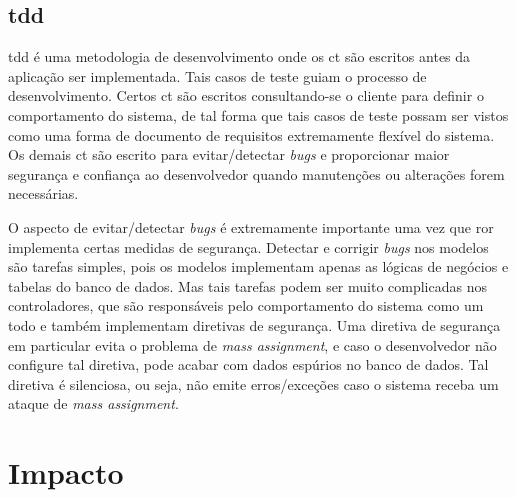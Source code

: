 \subsection{\gls{tdd}}

\gls{tdd} é uma metodologia de desenvolvimento onde os \gls{ct} são escritos antes da aplicação ser implementada. Tais casos de teste guiam
o processo de desenvolvimento. Certos \gls{ct} são escritos consultando-se o cliente para definir o comportamento do sistema, de tal forma que 
tais casos de teste possam ser vistos como uma forma de documento de requisitos extremamente flexível do sistema. Os demais \gls{ct}
são escrito para evitar/detectar \textit{bugs} e proporcionar maior segurança e confiança ao desenvolvedor quando manutenções ou alterações forem necessárias.

O aspecto de evitar/detectar \textit{bugs} é extremamente importante uma vez que \gls{ror} implementa certas medidas de segurança. Detectar e 
corrigir \textit{bugs} nos modelos são tarefas simples, pois os modelos implementam apenas as lógicas de negócios e tabelas do banco de dados. Mas tais tarefas
podem ser muito complicadas nos controladores, que são responsáveis pelo comportamento do sistema como um todo e também implementam diretivas de segurança.
Uma diretiva de segurança em particular evita o problema de \textit{mass assignment}, e caso o desenvolvedor não configure tal diretiva, pode acabar com
dados espúrios no banco de dados. Tal diretiva é silenciosa, ou seja, não emite erros/exceções caso o sistema receba um ataque de \textit{mass assignment}.

%

\section{Impacto}

